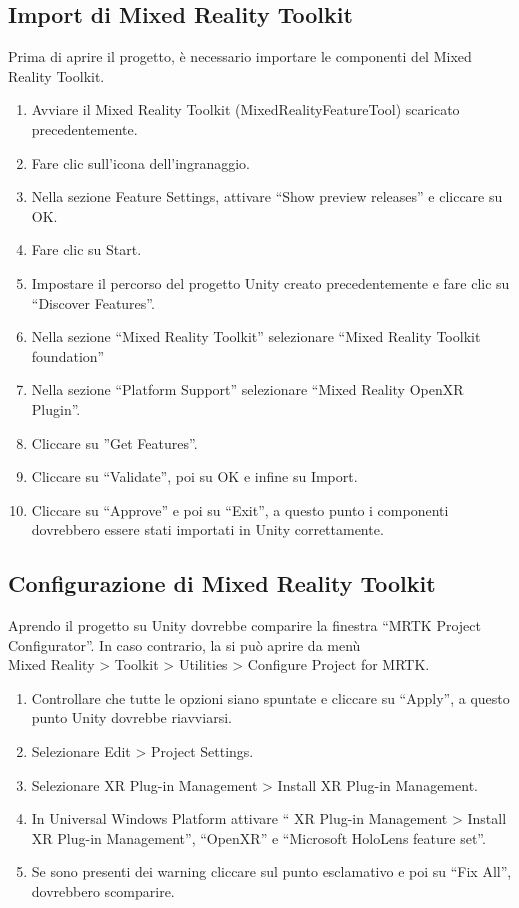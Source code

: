 \subsection{Import di Mixed Reality Toolkit}
Prima di aprire il progetto, è necessario importare le componenti del Mixed Reality Toolkit.
\begin{enumerate}
    \item Avviare il Mixed Reality Toolkit (MixedRealityFeatureTool) scaricato
precedentemente.
    \item Fare clic sull’icona dell’ingranaggio.
    \item  Nella sezione Feature Settings, attivare “Show preview releases” e cliccare su OK.
    \item Fare clic su Start.
    \item Impostare il percorso del progetto Unity creato precedentemente e fare clic su “Discover Features”.
    \item Nella sezione “Mixed Reality Toolkit” selezionare “Mixed Reality Toolkit foundation”
    \item Nella sezione “Platform Support” selezionare “Mixed Reality OpenXR Plugin”.
    \item Cliccare su ”Get Features”.
    \item Cliccare su “Validate”, poi su OK e infine su Import.
    \item Cliccare su “Approve” e poi su “Exit”, a questo punto i componenti dovrebbero essere stati importati in Unity correttamente.
\end{enumerate}

\subsection{Configurazione di Mixed Reality Toolkit}
Aprendo il progetto su Unity dovrebbe comparire la finestra “MRTK Project Configurator”. In caso contrario, la si può aprire da menù \\ 
Mixed Reality > Toolkit > Utilities > Configure Project for MRTK.
\begin{enumerate}
    \item Controllare che tutte le opzioni siano spuntate e cliccare su “Apply”, a questo punto Unity dovrebbe riavviarsi.
    \item Selezionare Edit > Project Settings.
    \item Selezionare XR Plug-in Management > Install XR Plug-in Management.
    \item In Universal Windows Platform attivare “ XR Plug-in Management > Install XR Plug-in Management”, “OpenXR” e “Microsoft HoloLens feature set”.
    \item Se sono presenti dei warning cliccare sul punto esclamativo e poi su “Fix All”, dovrebbero scomparire.
\end{enumerate}

